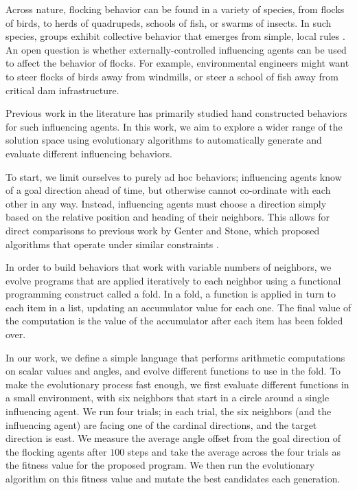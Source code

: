Across nature, flocking behavior can be found in a variety of species, from 
flocks of birds, to herds of quadrupeds, schools of fish, or swarms of insects.
In such species, groups exhibit collective behavior that emerges from simple, 
local rules \cite{sumpter2010collective}.
An open question is whether externally-controlled influencing agents can be 
used to affect the behavior of flocks.
For example, environmental engineers might want to steer flocks of birds away 
from windmills, or steer a school of fish away from critical dam
infrastructure.

Previous work in the literature has primarily studied hand constructed
behaviors for such influencing agents.
In this work, we aim to explore a wider range of the solution space using
evolutionary algorithms to automatically generate and evaluate different
influencing behaviors.

To start, we limit ourselves to purely ad hoc behaviors; influencing agents
know of a goal direction ahead of time, but otherwise cannot co-ordinate with
each other in any way.
Instead, influencing agents must choose a direction simply based on the relative
position and heading of their neighbors.
This allows for direct comparisons to previous work by Genter and Stone, which
proposed algorithms that operate under similar constraints
\cite{genter2013backsearch, genter2013visionstationary,
genter2014neighborsorientherd, genter2015placement,
genter2016facegoalfacecurrent, genter201612steplookahead, genterthesis}.

In order to build behaviors that work with variable numbers of neighbors, we
evolve programs that are applied iteratively to each neighbor using
a functional programming construct called a fold.
In a fold, a function is applied in turn to each item in a list, updating an
accumulator value for each one.
The final value of the computation is the value of the accumulator after each
item has been folded over.

In our work, we define a simple language that performs arithmetic computations
on scalar values and angles, and evolve different functions to use in the fold.
To make the evolutionary process fast enough, we first evaluate different
functions in a small environment, with six neighbors that start in a circle
around a single influencing agent.
We run four trials; in each trial, the six neighbors (and the influencing agent)
are facing one of the cardinal directions, and the target direction is east.
We measure the average angle offset from the goal direction of the flocking
agents after $100$ steps and take the average across the four trials as the
fitness value for the proposed program.
We then run the evolutionary algorithm on this fitness value and mutate the
best candidates each generation.

